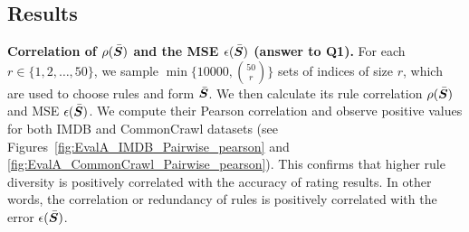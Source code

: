 \documentclass{article}
\newcommand{\bmS}{\bar{\mS}}
\begin{document}
\subsection{Results}\label{subsec:EvalA-Results}
\textbf{Correlation of $\rho(\bmS)$ and the MSE $\epsilon(\bmS)$ (answer to \textbf{Q1}).} For each $r \in \{1,2,\dots, 50\}$, we sample $\min\{10000, \binom{50}{r}\}$ sets of indices of size $r$, which are used to choose rules and form $\bmS$. We then calculate its rule correlation $\rho(\bmS)$ and MSE $\epsilon(\bmS)$. We compute their Pearson correlation and observe positive values for both IMDB and CommonCrawl datasets (see Figures~\ref{fig:EvalA_IMDB_Pairwise_pearson} and \ref{fig:EvalA_CommonCrawl_Pairwise_pearson}). This confirms that higher rule diversity is positively correlated with the accuracy of rating results. In other words, the correlation or redundancy of rules is positively correlated with the error $\epsilon(\bmS)$.
\end{document}
